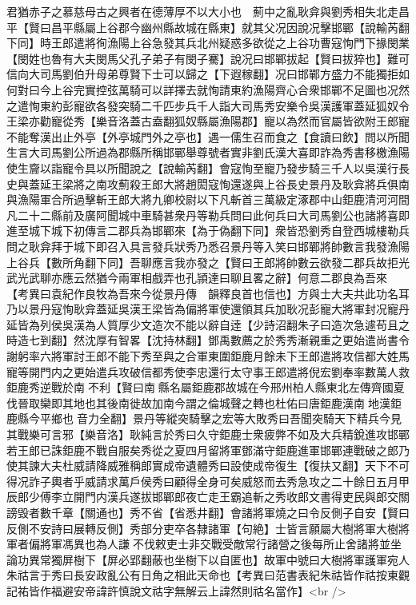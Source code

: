 君猶赤子之慕慈母古之興者在德薄厚不以大小也　薊中之亂耿弇與劉秀相失北走昌平【賢曰昌平縣屬上谷郡今幽州縣故城在縣東】就其父况因說况擊邯鄲【說輸芮翻下同】時王郎遣將徇漁陽上谷急發其兵北州疑惑多欲從之上谷功曹寇恂門下掾閔業【閔姓也魯有大夫閔馬父孔子弟子有閔子騫】說况曰邯鄲拔起【賢曰拔猝也】難可信向大司馬劉伯升母弟尊賢下士可以歸之【下遐稼翻】况曰邯鄲方盛力不能獨拒如何對曰今上谷完實控弦萬騎可以詳擇去就恂請東約漁陽齊心合衆邯鄲不足圖也况然之遣恂東約彭寵欲各發突騎二千匹步兵千人詣大司馬秀安樂令吳漢護軍蓋延狐奴令王梁亦勸寵從秀【樂音洛蓋古盍翻狐奴縣屬漁陽郡】寵以為然而官屬皆欲附王郎寵不能奪漢出止外亭【外亭城門外之亭也】遇一儒生召而食之【食讀曰飲】問以所聞生言大司馬劉公所過為郡縣所稱邯鄲舉尊號者實非劉氏漢大喜即詐為秀書移檄漁陽使生齎以詣寵令具以所聞說之【說輸芮翻】會寇恂至寵乃發步騎三千人以吳漢行長史與蓋延王梁將之南攻薊殺王郎大將趙閎寇恂還遂與上谷長史景丹及耿弇將兵俱南與漁陽軍合所過擊斬王郎大將九卿校尉以下凡斬首三萬級定涿郡中山鉅鹿清河河間凡二十二縣前及廣阿聞城中車騎甚衆丹等勒兵問曰此何兵曰大司馬劉公也諸將喜即進至城下城下初傳言二郡兵為邯鄲來【為于偽翻下同】衆皆恐劉秀自登西城樓勒兵問之耿弇拜于城下即召入具言發兵狀秀乃悉召景丹等入笑曰邯鄲將帥數言我發漁陽上谷兵【數所角翻下同】吾聊應言我亦發之【賢曰王郎將帥數云欲發二郡兵故拒光武光武聊亦應云然猶今兩軍相戲弄也孔頴達曰聊且畧之辭】何意二郡良為吾來　【考異曰袁紀作良牧為吾來今從景丹傳　韻釋良首也信也】方與士大夫共此功名耳乃以景丹寇恂耿弇蓋延吳漢王梁皆為偏將軍使還領其兵加耿况彭寵大將軍封况寵丹延皆為列侯吳漢為人質厚少文造次不能以辭自逹【少詩沼翻朱子曰造次急遽苟且之時造七到翻】然沈厚有智畧【沈持林翻】鄧禹數薦之於秀秀漸親重之更始遣尚書令謝躬率六將軍討王郎不能下秀至與之合軍東圍鉅鹿月餘未下王郎遣將攻信都大姓馬寵等開門内之更始遣兵攻破信都秀使李忠還行太守事王郎遣將倪宏劉奉率數萬人救鉅鹿秀逆戰於南不利【賢曰南縣名屬鉅鹿郡故城在今邢州柏人縣東北左傳齊國夏伐晉取欒即其地也其後南徙故加南今謂之倫城聲之轉也杜佑曰唐鉅鹿漢南地漢鉅鹿縣今平鄉也音力全翻】景丹等縱突騎擊之宏等大敗秀曰吾聞突騎天下精兵今見其戰樂可言邪【樂音洛】耿純言於秀曰久守鉅鹿士衆疲弊不如及大兵精銳進攻邯鄲若王郎已誅鉅鹿不戰自服矣秀從之夏四月留將軍鄧滿守鉅鹿進軍邯鄲連戰破之郎乃使其諫大夫杜威請降威雅稱郎實成帝遺體秀曰設使成帝復生【復扶又翻】天下不可得况詐子輿者乎威請求萬戶侯秀曰顧得全身可矣威怒而去秀急攻之二十餘日五月甲辰郎少傅李立開門内漢兵遂拔邯鄲郎夜亡走王霸追斬之秀收郎文書得吏民與郎交關謗毁者數千章【關通也】秀不省【省悉井翻】會諸將軍燒之曰令反側子自安【賢曰反側不安詩曰展轉反側】秀部分吏卒各隸諸軍【句絶】士皆言願屬大樹將軍大樹將軍者偏將軍馮異也為人謙不伐敕吏士非交戰受敵常行諸營之後每所止舍諸將並坐論功異常獨屏樹下【屏必郢翻蔽也坐樹下以自匿也】故軍中號曰大樹將軍護軍宛人朱祜言于秀曰長安政亂公有日角之相此天命也【考異曰范書表紀朱祜皆作祜按東觀記祐皆作福避安帝諱許慎說文祜字無解云上諱然則祜名當作】<br />
